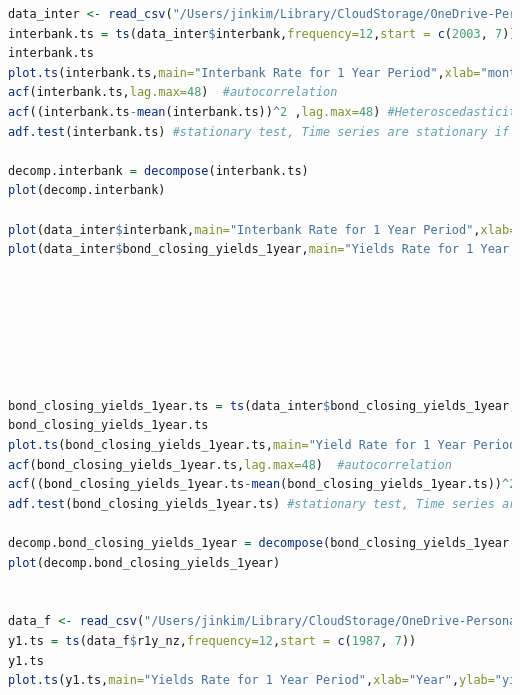 \documentclass[10pt]{article}
\begin{document}
\begin{lstlisting}[language=R]
data_inter <- read_csv("/Users/jinkim/Library/CloudStorage/OneDrive-Personal/Aucklanduni/2023 S2/ECON 723/Group Project/nz.csv")
interbank.ts = ts(data_inter$interbank,frequency=12,start = c(2003, 7))
interbank.ts
plot.ts(interbank.ts,main="Interbank Rate for 1 Year Period",xlab="month",ylab="interbank rate in percent",frequency=12,start = c(2003, 7))
acf(interbank.ts,lag.max=48)  #autocorrelation
acf((interbank.ts-mean(interbank.ts))^2 ,lag.max=48) #Heteroscedasticity 
adf.test(interbank.ts) #stationary test, Time series are stationary if they do not have trend or seasonal effects, p-value is obtained is greater than significance level of 0.05 and the ADF statistic is higher than any of the critical values. Clearly, there is no reason to reject the null hypothesis. So, the time series is in fact non-stationary.

decomp.interbank = decompose(interbank.ts)
plot(decomp.interbank)

plot(data_inter$interbank,main="Interbank Rate for 1 Year Period",xlab="month",ylab="swap rate in percent",frequency=12,start = c(2003, 7))
plot(data_inter$bond_closing_yields_1year,main="Yields Rate for 1 Year Period",xlab="month",ylab="yields rate in percent",frequency=12,start = c(2003, 7))







bond_closing_yields_1year.ts = ts(data_inter$bond_closing_yields_1year,frequency=12,start = c(2003, 7))
bond_closing_yields_1year.ts
plot.ts(bond_closing_yields_1year.ts,main="Yield Rate for 1 Year Period",xlab="month",ylab="yield rate in percent",frequency=12,start = c(2003, 7))
acf(bond_closing_yields_1year.ts,lag.max=48)  #autocorrelation
acf((bond_closing_yields_1year.ts-mean(bond_closing_yields_1year.ts))^2 ,lag.max=48) #Heteroscedasticity 
adf.test(bond_closing_yields_1year.ts) #stationary test, Time series are stationary if they do not have trend or seasonal effects, p-value is obtained is greater than significance level of 0.05 and the ADF statistic is higher than any of the critical values. Clearly, there is no reason to reject the null hypothesis. So, the time series is in fact non-stationary.

decomp.bond_closing_yields_1year = decompose(bond_closing_yields_1year.ts)
plot(decomp.bond_closing_yields_1year)


data_f <- read_csv("/Users/jinkim/Library/CloudStorage/OneDrive-Personal/Aucklanduni/2023 S2/ECON 723/Group Project/final data.csv")
y1.ts = ts(data_f$r1y_nz,frequency=12,start = c(1987, 7))
y1.ts
plot.ts(y1.ts,main="Yields Rate for 1 Year Period",xlab="Year",ylab="yield rate in percent",frequency=12,start = c(1987, 7))


\end{lstlisting}
\end{document}
